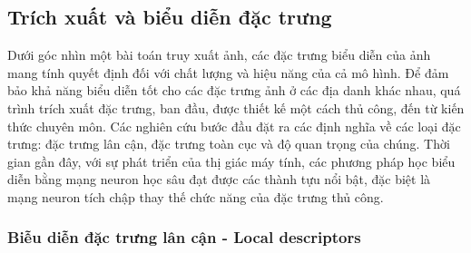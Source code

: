 \subsection{Trích xuất và biểu diễn đặc trưng}

Dưới góc nhìn một bài toán truy xuất ảnh, các đặc trưng biểu diễn của ảnh mang tính quyết định đối với chất lượng và hiệu năng của cả mô hình. Để đảm bảo khả năng biểu diễn tốt cho các đặc trưng ảnh ở các địa danh khác nhau, quá trình trích xuất đặc trưng, ban đầu, được thiết kế một cách thủ công, đến từ kiến thức chuyên môn. Các nghiên cứu bước đầu đặt ra các định nghĩa về các loại đặc trưng: đặc trưng lân cận, đặc trưng toàn cục và độ quan trọng của chúng. Thời gian gần đây, với sự phát triển của thị giác máy tính, các phương pháp học biểu diễn bằng mạng neuron học sâu đạt được các thành tựu nổi bật, đặc biệt là mạng neuron tích chập thay thế chức năng của đặc trưng thủ công.

\subsubsection{Biễu diễn đặc trưng lân cận - Local descriptors}

